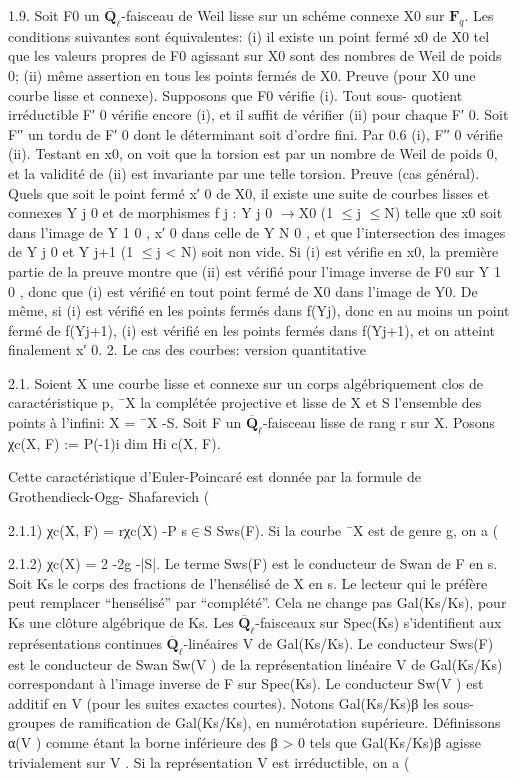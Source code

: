 \documentclass[11pt]{article}
\begin{document}
1.9. Soit F0 un \(\overline{\mathbf Q}_\ell\)-faisceau de Weil lisse sur un schéme connexe X0 sur \(\mathbf F_q\). Les conditions suivantes sont équivalentes: (i) il existe un point fermé x0 de X0 tel que les valeurs propres de F0 agissant sur X0 sont des nombres de Weil de poids 0; (ii) même assertion en tous les points fermés de X0. Preuve (pour X0 une courbe lisse et connexe). Supposons que F0 vérifie (i). Tout sous- quotient irréductible F′ 0 vérifie encore (i), et il suffit de vérifier (ii) pour chaque F′ 0. Soit F′′ un tordu de F′ 0 dont le déterminant soit d’ordre fini. Par 0.6 (i), F′′ 0 vérifie (ii). Testant en x0, on voit que la torsion est par un nombre de Weil de poids 0, et la validité de (ii) est invariante par une telle torsion. Preuve (cas général). Quels que soit le point fermé x′ 0 de X0, il existe une suite de courbes lisses et connexes Y j 0 et de morphismes f j : Y j 0 \(\to\)X0 (1 \(\le\)j \(\le\)N) telle que x0 soit dans l’image de Y 1 0 , x′ 0 dans celle de Y N 0 , et que l’intersection des images de Y j 0 et Y j+1 (1 \(\le\)j < N) soit non vide. Si (i) est vérifie en x0, la première partie de la preuve montre que (ii) est vérifié pour l’image inverse de F0 sur Y 1 0 , donc que (i) est vérifié en tout point fermé de X0 dans l’image de Y0. De même, si (i) est vérifié en les points fermés dans f(Yj), donc en au moins un point fermé de f(Yj+1), (i) est vérifié en les points fermés dans f(Yj+1), et on atteint finalement x′ 0. 2. Le cas des courbes: version quantitative 

2.1. Soient X une courbe lisse et connexe sur un corps algébriquement clos de caractéristique p, ¯X la complétée projective et lisse de X et S l’ensemble des points à l’infini: X = ¯X -S. Soit F un \(\overline{\mathbf Q}_\ell\)-faisceau lisse de rang r sur X. Posons χc(X, F) := P(-1)i dim Hi c(X, F).

Cette caractéristique d’Euler-Poincaré est donnée par la formule de Grothendieck-Ogg- Shafarevich (

2.1.1) χc(X, F) = rχc(X) -P s\(\in\)S Sws(F). Si la courbe ¯X est de genre g, on a (

2.1.2) χc(X) = 2 -2g -|S|. Le terme Sws(F) est le conducteur de Swan de F en s. Soit Ks le corps des fractions de l’hensélisé de X en s. Le lecteur qui le préfère peut remplacer “hensélisé” par “complété”. Cela ne change pas Gal(Ks/Ks), pour Ks une clôture algébrique de Ks. Les \(\overline{\mathbf Q}_\ell\)-faisceaux sur Spec(Ks) s’identifient aux représentations continues \(\overline{\mathbf Q}_\ell\)-linéaires V de Gal(Ks/Ks). Le conducteur Sws(F) est le conducteur de Swan Sw(V ) de la représentation linéaire V de Gal(Ks/Ks) correspondant à l’image inverse de F sur Spec(Ks). Le conducteur Sw(V ) est additif en V (pour les suites exactes courtes). Notons Gal(Ks/Ks)β les sous-groupes de ramification de Gal(Ks/Ks), en numérotation supérieure. Définissons α(V ) comme étant la borne inférieure des β > 0 tels que Gal(Ks/Ks)β agisse trivialement sur V . Si la représentation V est irréductible, on a (
\end{document}
